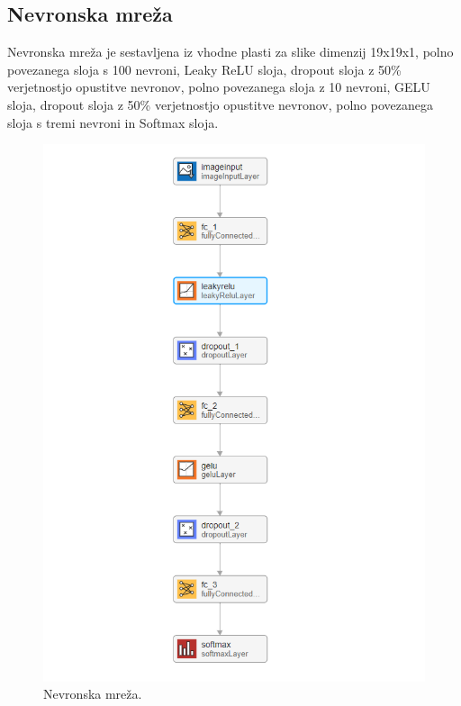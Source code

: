 \subsection{Nevronska mreža}
Nevronska mreža je sestavljena iz vhodne plasti za slike dimenzij 19x19x1, polno povezanega sloja s 100 nevroni, Leaky ReLU sloja, dropout sloja z 50\% verjetnostjo opustitve nevronov, polno povezanega sloja z 10 nevroni, GELU sloja, dropout sloja z 50\% verjetnostjo opustitve nevronov, polno povezanega sloja s tremi nevroni in Softmax sloja. 
\begin{figure}[h!]
\begin{center}
\includegraphics[width=0.5\linewidth]{slike/Neural network.png}
\end{center}
\caption{Nevronska mreža.}
\end{figure}

